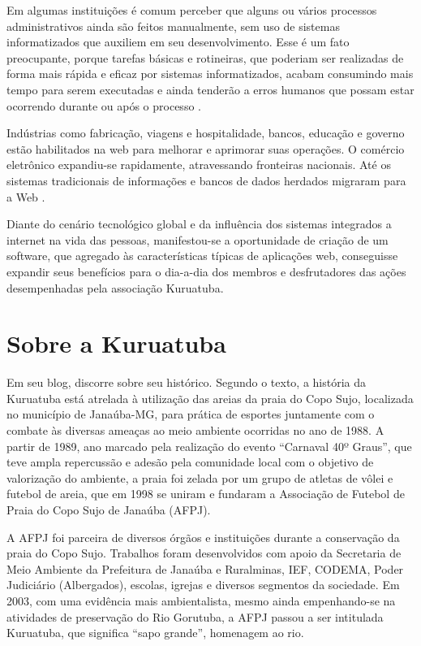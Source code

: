 Em algumas instituições é comum perceber que alguns ou vários processos administrativos ainda são feitos manualmente, sem uso de sistemas informatizados que auxiliem em seu desenvolvimento. Esse é um fato preocupante, porque tarefas básicas e rotineiras, que poderiam ser realizadas de forma mais rápida e eficaz por sistemas informatizados, acabam consumindo mais tempo para serem executadas e ainda tenderão a erros humanos que possam estar ocorrendo durante ou após o processo \cite{othman2009development}. 

\begin{citacao}
Indústrias como fabricação, viagens e hospitalidade, bancos, educação e governo estão habilitados na web para melhorar e aprimorar suas operações. O comércio eletrônico expandiu-se rapidamente, atravessando fronteiras nacionais. Até os sistemas tradicionais de informações e bancos de dados herdados migraram para a Web \cite[p. 1]{ginige2001web}.
\end{citacao}

Diante do cenário tecnológico global e da influência dos sistemas integrados a internet na vida das pessoas, manifestou-se a oportunidade de criação de um software, que agregado às características típicas de aplicações web, conseguisse expandir seus benefícios para o dia-a-dia dos membros e desfrutadores das ações desempenhadas pela associação Kuruatuba.

\hspace{2.5cm}
\section{Sobre a Kuruatuba}
\hspace{2.5cm}

Em seu blog,  discorre sobre seu histórico. Segundo o texto, a história da Kuruatuba está atrelada à utilização das areias da praia do Copo Sujo, localizada no município de Janaúba-MG, para prática de esportes juntamente com o combate às diversas ameaças ao meio ambiente ocorridas no ano de 1988. A partir de 1989, ano marcado pela realização do evento ``Carnaval 40º Graus'', que teve ampla repercussão e adesão pela comunidade local com o objetivo de valorização do ambiente, a praia foi zelada por um grupo de atletas de vôlei e futebol de areia, que em 1998 se uniram e fundaram a Associação de Futebol de Praia do Copo Sujo de Janaúba (AFPJ).

A AFPJ foi parceira de diversos órgãos e instituições durante a conservação da praia do Copo Sujo. Trabalhos foram desenvolvidos com apoio da Secretaria de Meio Ambiente da Prefeitura de Janaúba e Ruralminas, IEF, CODEMA, Poder Judiciário (Albergados), escolas, igrejas e diversos segmentos da sociedade. Em 2003, com uma evidência mais ambientalista, mesmo ainda empenhando-se na atividades de preservação do Rio Gorutuba, a AFPJ passou a ser intitulada Kuruatuba, que significa ``sapo grande'', homenagem ao rio.  

